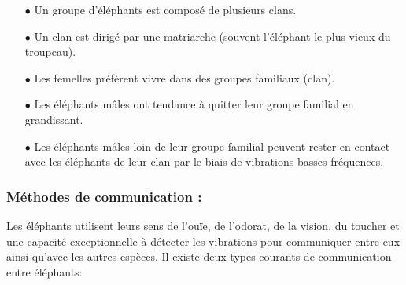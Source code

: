 \begin{itemize}
	\item[$\bullet$] Un groupe d'éléphants est composé de plusieurs clans.
	\item[$\bullet$] Un clan est dirigé par une matriarche (souvent l'éléphant le plus vieux du troupeau).
	\item[$\bullet$] Les femelles préfèrent vivre dans des groupes familiaux (clan).
	\item[$\bullet$] Les éléphants mâles ont tendance à quitter leur groupe familial en grandissant.
	\item[$\bullet$] Les éléphants mâles loin de leur groupe familial peuvent rester en contact avec les éléphants de leur clan par le biais de vibrations basses fréquences.
	
\end{itemize}


\subsubsection*{Méthodes de communication \cite{EHO1}:}

Les éléphants utilisent leurs sens de l'ouïe, de l'odorat, de la vision, du toucher et une capacité exceptionnelle à détecter les vibrations pour communiquer entre eux ainsi qu'avec les autres espèces. Il existe deux types courants de communication entre éléphants:

